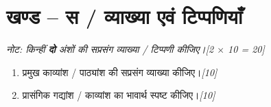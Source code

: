 \documentclass[11pt,a4paper]{article}
\newcommand{\pts}[1]{\hfill \textit{[#1]}}
\begin{document}
\bigskip

\section*{खण्ड -- स / व्याख्या एवं टिप्पणियाँ}
\noindent \textit{नोट: किन्हीं \textbf{दो} अंशों की सप्रसंग व्याख्या / टिप्पणी कीजिए।}\pts{2 $\times$ 10 = 20}

\begin{enumerate}[label=\textbf{(\ क\ )},leftmargin=*,itemsep=10pt]
  \item[\textbf{(क)}] प्रमुख काव्यांश / पाठ्यांश की सप्रसंग व्याख्या कीजिए।\pts{10}
  \item[\textbf{(ख)}] प्रासंगिक गद्यांश / काव्यांश का भावार्थ स्पष्ट कीजिए।\pts{10}
\end{enumerate}
\end{document}

